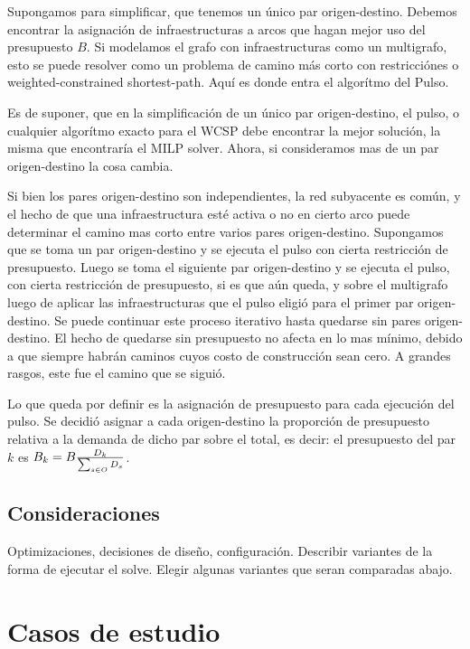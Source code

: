 \documentclass{article}
\begin{document}
  Supongamos para simplificar, que tenemos un único par origen-destino. Debemos encontrar la asignación de infraestructuras a arcos que hagan mejor uso del presupuesto $B$. Si modelamos el grafo con infraestructuras como un multigrafo, esto se puede resolver como un problema de camino más corto con restricciónes o weighted-constrained shortest-path. Aquí es donde entra el algorítmo del Pulso.

  Es de suponer, que en la simplificación de un único par origen-destino, el pulso, o cualquier algorítmo exacto para el WCSP debe encontrar la mejor solución, la misma que encontraría el MILP solver. Ahora, si consideramos mas de un par origen-destino la cosa cambia.

  Si bien los pares origen-destino son independientes, la red subyacente es común, y el hecho de que una infraestructura esté activa o no en cierto arco puede determinar el camino mas corto entre varios pares origen-destino. Supongamos que se toma un par origen-destino y se ejecuta el pulso con cierta restricción de presupuesto. Luego se toma el siguiente par origen-destino y se ejecuta el pulso, con cierta restricción de presupuesto, si es que aún queda, y sobre el multigrafo luego de aplicar las infraestructuras que el pulso eligió para el primer par origen-destino. Se puede continuar este proceso iterativo hasta quedarse sin pares origen-destino. El hecho de quedarse sin presupuesto no afecta en lo mas mínimo, debido a que siempre habrán caminos cuyos costo de construcción sean cero. A grandes rasgos, este fue el camino que se siguió.

  Lo que queda por definir es la asignación de presupuesto para cada ejecución del pulso. Se decidió asignar a cada origen-destino la proporción de presupuesto relativa a la demanda de dicho par sobre el total, es decir: el presupuesto del par $k$ es $B_k = B  {D_k \over \sum_{s \in O} D_s}$.

  \subsection*{Consideraciones}

  Optimizaciones, decisiones de diseño, configuración.
  Describir variantes de la forma de ejecutar el solve. Elegir algunas variantes que seran comparadas abajo.

  \section*{Casos de estudio}
\end{document}
